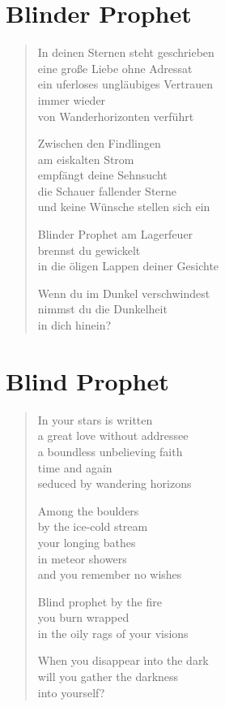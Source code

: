 
\cleartoverso

\section{Blinder Prophet}

\begin{verse}

In deinen Sternen steht geschrieben\\
eine große Liebe ohne Adressat\\
ein uferloses ungläubiges Vertrauen\\
immer wieder\\
von Wanderhorizonten verführt

Zwischen den Findlingen\\
am eiskalten Strom\\
empfängt deine Sehnsucht\\
die Schauer fallender Sterne\\
und keine Wünsche stellen sich ein

Blinder Prophet am Lagerfeuer\\
brennst du gewickelt\\
in die öligen Lappen deiner Gesichte

Wenn du im Dunkel verschwindest\\
nimmst du die Dunkelheit\\
in dich hinein?

\end{verse}

\clearpage

\section{Blind Prophet}

\begin{verse}

In your stars is written\\
a great love without addressee\\
a boundless unbelieving faith\\
time and again\\
seduced by wandering horizons

Among the boulders\\
by the ice-cold stream\\
your longing bathes\\
in meteor showers\\
and you remember no wishes

Blind prophet by the fire\\
you burn wrapped\\
in the oily rags of your visions

When you disappear into the dark\\
will you gather the darkness\\
into yourself?

\end{verse}

